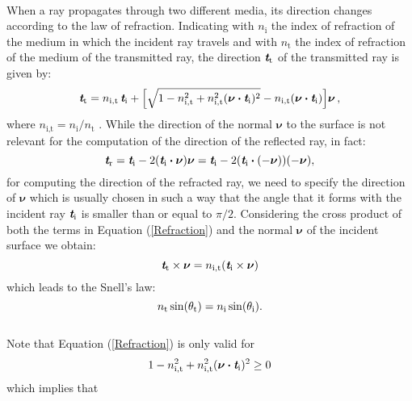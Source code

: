 \\ When a ray propagates through two different media, its direction changes according to the law of refraction. 
Indicating with $n_\textrm{i}$ the index of refraction of the medium in which the incident ray travels and with 
$n_\textrm{t}$ the index of refraction of the medium of the transmitted ray, the direction $\textit{\textbf{t}}_\textrm{t}$ of the transmitted ray is given by:
\begin{equation}\label{Refraction}
\textit{\textbf{t}}_\textrm{t} = n_{\textrm{i},\textrm{t}}\,\textit{\textbf{t}}_\textrm{i}+
\Big[\sqrt{1-n_{\textrm{i},\textrm{t}}^2+
n_{\textrm{i},\textrm{t}}^2(\boldsymbol{\nu}\boldsymbol{\cdot}\textit{\textbf{t}}_\textrm{i})^2}
-n_{\textrm{i},\textrm{t}}(\boldsymbol{\nu}\boldsymbol{\cdot}\textit{\textbf{t}}_\textrm{i}) \Big]\boldsymbol{\nu}\,,
\end{equation}
where $n_{\textrm{i},\textrm{t}}=n_\textrm{i}/n_\textrm{t}$ \cite{chaves2015introduction}.
While the direction of the normal $\boldsymbol{\nu}$ to the surface is not relevant for the computation of the direction of the reflected ray, in fact:
\begin{equation}
\textit{\textbf{t}}_\textrm{r} = \textit{\textbf{t}}_\textrm{i}-2(\textit{\textbf{t}}_\textrm{i}\boldsymbol{\cdot}\boldsymbol{\nu})\boldsymbol{\nu}= \textit{\textbf{t}}_\textrm{i}-2(\textit{\textbf{t}}_\textrm{i}\boldsymbol{\cdot}(-\boldsymbol{\nu}))(-\boldsymbol{\nu}), 
\end{equation}
for computing the direction of the refracted ray, we need to specify the direction of $\boldsymbol{\nu}$ which is usually chosen in such a way that the angle that it forms with the incident ray $\textit{\textbf{t}}_\textrm{i}$ is smaller than or equal to $\pi/2$. 
Considering the cross product of both the terms in Equation (\ref{Refraction}) and the normal $\boldsymbol{\nu}$ of the incident surface we obtain:
\begin{equation}
\textit{\textbf{t}}_\textrm{t}\times\boldsymbol{\nu} = n_{\textrm{i},\textrm{t}}(\textit{\textbf{t}}_\textrm{i}\times\boldsymbol{\nu})
\end{equation}
which leads to the Snell's law:
\begin{equation}\label{eq:snell}
n_\textrm{t}\sin(\theta_\textrm{t}) = n_\textrm{i}\sin(\theta_\textrm{i}).
\end{equation}
\\\indent
Note that Equation (\ref{Refraction}) is only valid for 
\begin{equation}\label{tir}
1-n_{\textrm{i},\textrm{t}}^2+n_{\textrm{i},\textrm{t}}^2(\boldsymbol{\nu}\boldsymbol{\cdot}\textit{\textbf{t}}_\textrm{i})^2\geq 0 
\end{equation} which implies that
